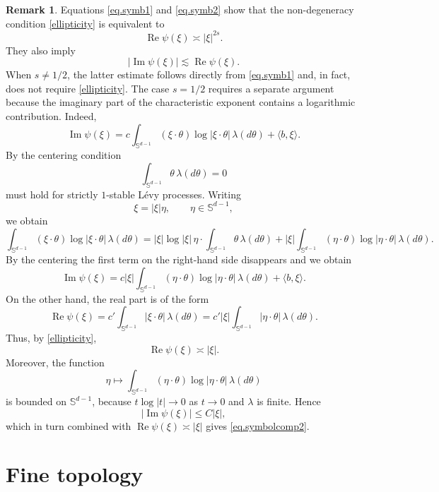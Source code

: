 \documentclass[11pt,a4paper,reqno]{amsart}
\theoremstyle{definition}
\newtheorem{remark}[theorem]{Remark}
\numberwithin{equation}{section}
\begin{document}
\begin{remark}
Equations \eqref{eq.symb1} and \eqref{eq.symb2} show 
that the non-degeneracy condition \eqref{ellipticity} is equivalent to 
\begin{equation}
\label{eq.symbolcomp1}
\operatorname{Re}\psi(\xi)\asymp|\xi|^{2s}. 
\end{equation}
They also imply 
\begin{equation}
\label{eq.symbolcomp2}
|\operatorname{Im}\psi(\xi)| \lesssim \operatorname{Re}\psi(\xi). 
\end{equation}
When \(s\neq1/2\), the latter estimate follows directly from \eqref{eq.symb1} and, in fact, 
does not require \eqref{ellipticity}. The case \(s=1/2\) requires a separate argument because the imaginary part 
of the characteristic exponent contains a logarithmic contribution.
Indeed,
\[
\operatorname{Im}\psi(\xi)
=
c\int_{\mathbb S^{d-1}}
(\xi\cdot\theta)\log|\xi\cdot\theta|\,\lambda(d\theta)+\langle b, \xi\rangle.
\]
By  \cite[Theorem 14.10]{Sato}  the centering condition
\[
\int_{\mathbb S^{d-1}}\theta\,\lambda(d\theta)=0
\]
must hold for strictly $1$-stable L\'evy processes.
Writing
\[
\xi=|\xi|\eta,\qquad \eta\in\mathbb S^{d-1},
\]
we obtain
\[
\int_{\mathbb S^{d-1}}
(\xi\cdot\theta)\log|\xi\cdot\theta|\,\lambda(d\theta)
=
|\xi|\log|\xi|\,
\eta\cdot \int_{\mathbb S^{d-1}}\theta\,\lambda(d\theta)
+
|\xi|
\int_{\mathbb S^{d-1}}
(\eta\cdot\theta)\log|\eta\cdot\theta|\,\lambda(d\theta).
\]
By the centering the first term on the right-hand side disappears and we obtain
\[
\operatorname{Im}\psi(\xi)
=
c|\xi|
\int_{\mathbb S^{d-1}}
(\eta\cdot\theta)\log|\eta\cdot\theta|\,\lambda(d\theta)+\langle b, \xi\rangle.
\]
On the other hand, the real part is of the form
\[
\operatorname{Re}\psi(\xi)
=
c'
\int_{\mathbb S^{d-1}}|\xi\cdot\theta|\,\lambda(d\theta)
=
c'|\xi|
\int_{\mathbb S^{d-1}}|\eta\cdot\theta|\,\lambda(d\theta).
\]
Thus, by \eqref{ellipticity},
\[
\operatorname{Re}\psi(\xi)\asymp |\xi|.
\]
Moreover, the function
\[
\eta\mapsto
\int_{\mathbb S^{d-1}}
(\eta\cdot\theta)\log|\eta\cdot\theta|\,\lambda(d\theta)
\]
is bounded on $\mathbb S^{d-1}$, because $t\log|t|\to 0$ as $t\to 0$ and
$\lambda$ is finite. Hence
\[
|\operatorname{Im}\psi(\xi)|
\le C|\xi|,
\]
which in turn combined  with $\operatorname{Re}\psi(\xi)\asymp |\xi|$ gives \eqref{eq.symbolcomp2}.
\end{remark}

\section{Fine topology}
\end{document}
